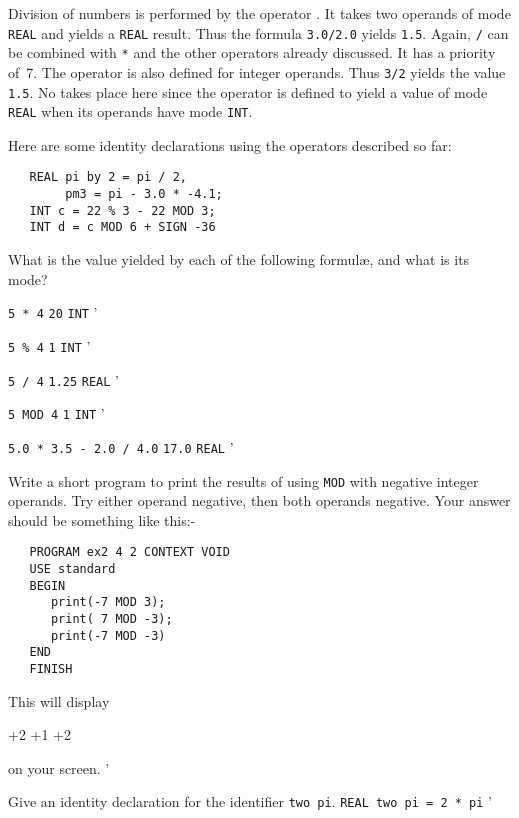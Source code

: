 Division of  numbers is performed by the
operator \ixtt{/}. It takes two operands of mode \verb|REAL| and
yields a \verb|REAL| result.  Thus the formula \verb|3.0/2.0| yields
\verb|1.5|.  Again, \verb|/| can be combined with \verb|*| and the
other operators already discussed.  It has a priority of~7. The
operator is also defined for integer operands.  Thus \verb|3/2|
yields the value \verb|1.5|.  No 
takes place here since the operator is defined to yield a value of
mode \verb|REAL| when its operands have mode \verb|INT|.

Here are some identity declarations using the operators described so
far:
\begin{verbatim}
   REAL pi by 2 = pi / 2,
        pm3 = pi - 3.0 * -4.1;
   INT c = 22 % 3 - 22 MOD 3;
   INT d = c MOD 6 + SIGN -36
\end{verbatim}

\begin{exercise}
\item What is the value yielded by each of the following formul{\ae}, and
what is its mode?
\begin{subex}
\item \verb|5 * 4| \subans \verb|20| \verb|INT|
'
\item \verb|5 % 4| \subans \verb|1| \verb|INT|
'
\item \verb|5 / 4| \subans \verb|1.25| \verb|REAL|
'
\item \verb|5 MOD 4| \subans \verb|1| \verb|INT|
'
\item \verb|5.0 * 3.5 - 2.0 / 4.0| \subans \verb|17.0| \verb|REAL|
'
\end{subex}
\item Write a short program to print the results of using \verb|MOD| with
negative integer operands. Try either operand negative, then both
operands negative. \ans Your answer should be something like this:-
\begin{verbatim}
   PROGRAM ex2 4 2 CONTEXT VOID
   USE standard
   BEGIN
      print(-7 MOD 3);
      print( 7 MOD -3);
      print(-7 MOD -3)
   END
   FINISH
\end{verbatim}
\noindent
This will display
\begin{verbatim*}
         +2          +1          +2
\end{verbatim*}
on your screen.
'
\item Give an identity declaration for the identifier
\verb|two pi|. \ans \verb|REAL two pi = 2 * pi|
'
\end{exercise}

